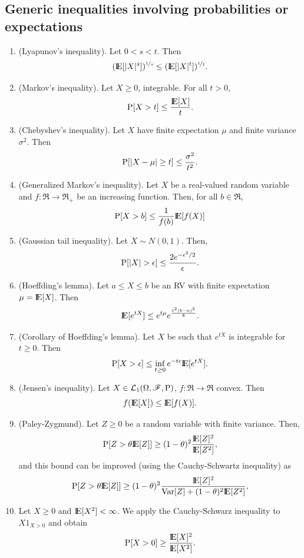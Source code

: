 \documentclass[a4paper,10pt]{scrbook}
\begin{document}
\subsection{Generic inequalities involving probabilities or expectations}
\begin{enumerate}
  \item (Lyapunov's inequality). Let $0<s<t$. Then
  \[
   (\E[|X|^s])^{\nicefrac{1}{s}} \leq (\E[|X|^t])^{\nicefrac{1}{t}}.
  \]

  \item (Markov's inequality). Let $X\geq 0$, integrable. For all $t>0$, 
 \[ 
 \prob[X>t]\leq \frac{\E[X]}{t}.
 \]
 \item (Chebyshev's inequality). Let $X$ have finite expectation $\mu$ and finite variance $\sigma^2$. Then
 \[
  \mathrm{P}[|X-\mu|\geq t] \leq \frac{\sigma^2}{t^2}.
 \]
 \item (Generalized Markov's inequality). Let $X$ be a real-valued random variable and $f:\Re\to\Re_+$
       be an increasing function. Then, for all $b\in\Re$,
       \[
        \prob[X>b]\leq \frac{1}{f(b)}\E[f(X)]
       \]
  \item (Gaussian tail inequality). Let $X\sim N(0,1)$. Then,
 \[ 
  \prob[|X|>\epsilon] \leq \frac{2e^{-\epsilon^2/2}}{\epsilon}.
 \]       
 \item (Hoeffding's lemma). Let $a\leq X\leq b$ be an RV with finite expectation $\mu=\E[X]$.
 Then
 \[
  \E[e^{tX}] \leq e^{t\mu}e^{\frac{t^2(b-a)^2}{8}}.
 \]
\item (Corollary of Hoeffding's lemma). Let $X$ be such that $e^{tX}$ is integrable for $t\geq 0$. Then
\[
 \prob[X>\epsilon]\leq \inf_{t\geq 0}e^{-t\epsilon}\E[e^{tX}].
\]
 \item (Jensen's inequality). Let $X\in\mathcal{L}_1(\Omega,\mathscr{F},\mathrm{P})$, $f:\Re\to\Re$ convex. Then
   \[
     f(\E[X])\leq \E[f(X)].
    \]
\item (Paley-Zygmund). Let $Z\geq 0$ be a random variable with finite variance. Then,
      \[
       \prob[Z > \theta \E[Z]] \geq (1-\theta)^2\frac{\E[Z]^2}{\E[Z^2]},
      \]
     and this bound can be improved (using the Cauchy-Schwartz inequality) as
     \[
       \prob[Z > \theta \E[Z]] \geq (1-\theta)^2\frac{\E[Z]^2}{\mathrm{Var}[Z]+(1-\theta)^2\E[Z^2]},
      \]
\item Let $X\geq 0$ and $\E[X^2]<\infty$. We apply the Cauchy-Schwarz inequality to $X1_{X>0}$ and obtain
      \[
       \prob[X>0] \geq \frac{\E[X]^2}{\E[X^2]}.
      \]




\end{enumerate}
\end{document}
